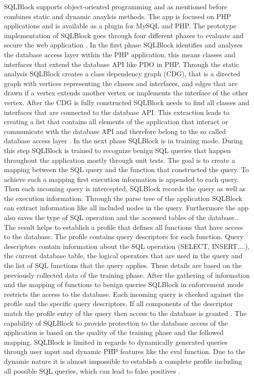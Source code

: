 SQLBlock supports object-oriented programming and as mentioned before combines static and dynamic anaylsis methods. The app is focused on PHP applications and is available as a plugin for MySQL and PHP. The prototype implementation of SQLBlock goes through four different phases to evaluate and secure the web application \autocite[1, 5]{Jahanshahi2018}.\newline
In the first phase SQLBlock identifies and analyses the database access layer within the PHP application, this means classes and interfaces that extend the database API like PDO in PHP. Through the static analysis SQLBlock creates a class dependency graph (CDG), that is a directed graph with vertices representing the classes and interfaces, and edges that are drawn if a vertex extends another vertex or implements the interface of the other vertex. After the CDG is fully constructed SQLBlock needs to find all classes and interfaces that are connected to the database API. This extraction leads to creating a list that contains all elements of the application that interact or communicate with the database API and therefore belong to the so called database access layer \autocite[3, 6]{Jahanshahi2018}.\newline
In the next phase SQLBlock is in training mode. During this step SQLBlock is trained to recognize benign SQL queries that happen throughout the application mostly through unit tests. The goal is to create a mapping between the SQL query and the function that constructed the query. To achieve such a mapping first execution information is appended to each query. Then each incoming query is intercepted, SQLBlock records the query as well as the execution information. Through the parse tree of the application SQLBlock can extract information like all included nodes in the query. Furthermore the app also saves the type of SQL operation and the accessed tables of the database.\autocite[6]{Jahanshahi2018}. The result helps to establish a profile that defines all functions that have access to the database. The profile contains query descriptors for each function. Query descriptors contain information about the SQL operation (SELECT, INSERT,...), the current database table, the logical operators that are used in the query and the list of SQL functions that the query applies. These details are based on the previously collected data of the training phase. After the gathering of information and the mapping of functions to benign queries SQLBlock in enforcement mode restricts the access to the database. Each incoming query is checked against the profile and the specific query descriptors. If all components of the descriptor match the profile entry of the query then access to the database is granted \autocite[7]{Jahanshahi2018}. The capability of SQLBlock to provide protection to the database access of the application is based on the quality of the training phase and the followed mapping. SQLBlock is limited in regards to dynamically generated queries through user input and dynamic PHP features like the eval function. Due to the dynamic nature it is almost impossible to establish a complete profile including all possible SQL queries, which can lead to false positives \autocite[12]{Jahanshahi2018}.




